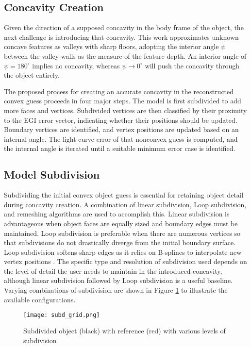\subsection{Concavity Creation}

Given the direction of a supposed concavity in the body frame of the object, the next challenge is introducing that concavity. This work approximates unknown concave features as valleys with sharp floors, adopting the interior angle $\psi$ between the valley walls as the measure of the feature depth. An interior angle of $\psi=180^\circ$ implies no concavity, whereas $\psi \rightarrow 0^\circ$ will push the concavity through the object entirely.

The proposed process for creating an accurate concavity in the reconstructed convex guess proceeds in four major steps. The model is first subdivided to add more faces and vertices. Subdivided vertices are then classified by their proximity to the EGI error vector, indicating whether their positions should be updated. Boundary vertices are identified, and vertex positions are updated based on an internal angle. The light curve error of that nonconvex guess is computed, and the internal angle is iterated until a suitable minimum error case is identified.

\subsection{Model Subdivision}

Subdividing the initial convex object guess is essential for retaining object detail during concavity creation. A combination of linear subdivision, Loop subdivision, and remeshing algorithms are used to accomplish this. Linear subdivision is advantageous when object faces are equally sized and boundary edges must be maintained. Loop subdivision is preferable when there are numerous vertices so that subdivisions do not drastically diverge from the initial boundary surface. Loop subdivision softens sharp edges as it relies on B-splines to interpolate new vertex positions \cite{loop1987}. The specific type and resolution of subdivision used depends on the level of detail the user needs to maintain in the introduced concavity, although linear subdivision followed by Loop subdivision is a useful baseline. Varying combinations of subdivision are shown in Figure \ref{fig:subd_grid} to illustrate the available configurations.

\graphicspath{{/Users/liamrobinson/Documents/msthesis/static_images/aas_2022_figs}}
\begin{figure}[!htb]
  \centering
  \texttt{[image: subd\_grid.png]}
  \caption{Subdivided object (black) with reference (red) with various levels of subdivision}
  \label{fig:subd_grid}
\end{figure}

